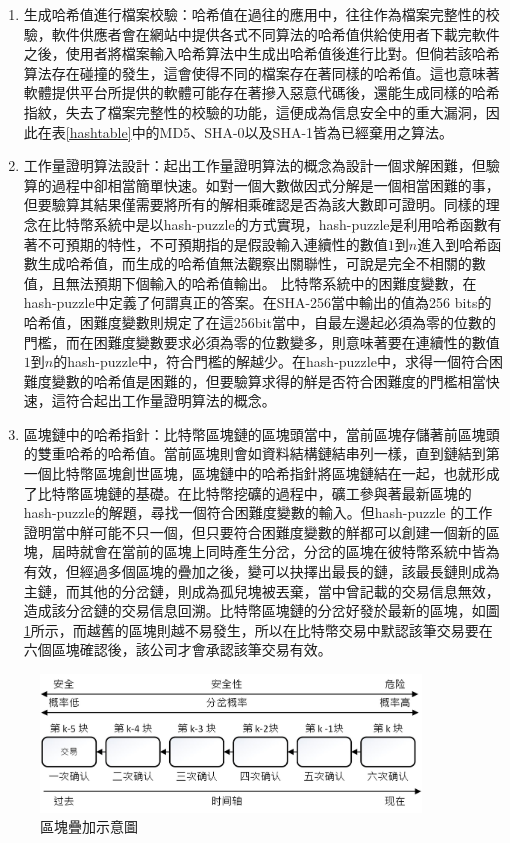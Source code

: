 				\begin{enumerate}
				\item 生成哈希值進行檔案校驗：哈希值在過往的應用中，往往作為檔案完整性的校驗，軟件供應者會在網站中提供各式不同算法的哈希值供給使用者下載完軟件之後，使用者將檔案輸入哈希算法中生成出哈希值後進行比對。但倘若該哈希算法存在碰撞的發生，這會使得不同的檔案存在著同樣的哈希值。這也意味著軟體提供平台所提供的軟體可能存在著摻入惡意代碼後，還能生成同樣的哈希指紋，失去了檔案完整性的校驗的功能，這便成為信息安全中的重大漏洞，因此在表\ref{hashtable}中的MD5、SHA-0以及SHA-1皆為已經棄用之算法。
				\item 工作量證明算法設計：起出工作量證明算法的概念為設計一個求解困難，但驗算的過程中卻相當簡單快速。如對一個大數做因式分解是一個相當困難的事，但要驗算其結果僅需要將所有的解相乘確認是否為該大數即可證明。同樣的理念在比特幣系統中是以hash-puzzle的方式實現，hash-puzzle是利用哈希函數有著不可預期的特性，不可預期指的是假設輸入連續性的數值$1$到$n$進入到哈希函數生成哈希值，而生成的哈希值無法觀察出關聯性，可說是完全不相關的數值，且無法預期下個輸入的哈希值輸出。
				比特幣系統中的困難度變數，在hash-puzzle中定義了何謂真正的答案。在SHA-256當中輸出的值為256 bits的哈希值，困難度變數則規定了在這256bit當中，自最左邊起必須為零的位數的門檻，而在困難度變數要求必須為零的位數變多，則意味著要在連續性的數值$1$到$n$的hash-puzzle中，符合門檻的解越少。在hash-puzzle中，求得一個符合困難度變數的哈希值是困難的，但要驗算求得的觧是否符合困難度的門檻相當快速，這符合起出工作量證明算法的概念。
				\item 區塊鏈中的哈希指針：比特幣區塊鏈的區塊頭當中，當前區塊存儲著前區塊頭的雙重哈希的哈希值。當前區塊則會如資料結構鏈結串列一樣，直到鏈結到第一個比特幣區塊創世區塊，區塊鏈中的哈希指針將區塊鏈結在一起，也就形成了比特幣區塊鏈的基礎。在比特幣挖礦的過程中，礦工參與著最新區塊的hash-puzzle的解題，尋找一個符合困難度變數的輸入。但hash-puzzle 的工作證明當中觧可能不只一個，但只要符合困難度變數的觧都可以創建一個新的區塊，屆時就會在當前的區塊上同時產生分岔，分岔的區塊在彼特幣系統中皆為有效，但經過多個區塊的疊加之後，變可以抉擇出最長的鏈，該最長鏈則成為主鏈，而其他的分岔鏈，則成為孤兒塊被丟棄，當中曾記載的交易信息無效，造成該分岔鏈的交易信息回溯。比特幣區塊鏈的分岔好發於最新的區塊，如圖\ref{6confirm}所示，而越舊的區塊則越不易發生，所以在比特幣交易中默認該筆交易要在六個區塊確認後，該公司才會承認該筆交易有效。
				\end{enumerate}

				\begin{figure}[htbp]
					\centering
					\includegraphics[width = 0.9\textwidth]{6confirm.jpg}
					\caption{區塊疊加示意圖}\label{6confirm}
				\end{figure}

